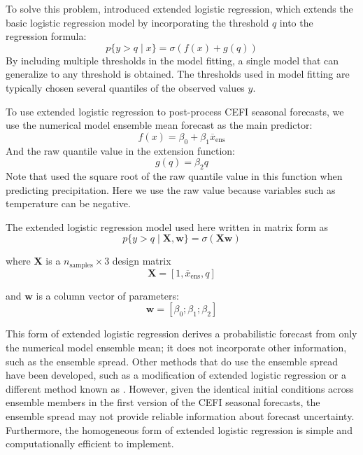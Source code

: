 \documentclass[12pt]{article}
\begin{document}
To solve this problem, \citet{Wilks2009} introduced extended logistic regression,
which extends the basic logistic regression model by incorporating
the threshold $q$ into the regression formula:
\begin{equation}
    p\{y > q \mid x\} = \sigma(f(x) + g(q))
\end{equation}
By including multiple thresholds in the model fitting,
a single model that can generalize to any threshold is obtained. 
The thresholds used in model fitting are typically chosen several
quantiles of the observed values $y$. 

To use extended logistic regression to post-process CEFI
seasonal forecasts, we use the numerical model ensemble mean 
forecast as the main predictor:
\begin{equation}
    f(x) = \beta_0 + \beta_1 \overline{x}_{\textrm{ens}}
\end{equation}
And the raw quantile value in the extension function:
\begin{equation}
    g(q) = \beta_2 q
\end{equation}
Note that \citet{Wilks2009} used the square root of the raw quantile value in this function when predicting precipitation. Here we use
the raw value because variables such as temperature can be negative. 

The extended logistic regression model used here written in matrix form as 
\begin{equation}
    p \{y > q \mid \mathbf{X}, \mathbf{w} \} = \sigma(\mathbf{X w})
    \label{eqn:elr}
\end{equation}

where $\mathbf{X}$ is a $n_{\textrm{samples}} \times 3$ design matrix
\begin{equation}
    \mathbf{X} = [1, \overline{x}_{\textrm{ens}}, q]
\end{equation}

and $ \mathbf{w} $ is a column vector of parameters:
\begin{equation}
    \mathbf{w} = [\beta_0; \beta_1; \beta_2]
\end{equation}

This form of extended logistic regression derives a probabilistic
forecast from only the numerical model ensemble mean; it does not incorporate other information,
such as the ensemble spread.
Other methods that do use the ensemble spread have been developed,
such as a modification of extended logistic regression \citep{Messner2014}
or a different method known as  \citep{Gneiting2005}.
However, given the identical initial conditions across ensemble members
in the first version of the CEFI seasonal forecasts, the ensemble spread
may not provide reliable information about forecast uncertainty.
Furthermore, the homogeneous form of extended logistic regression
is simple and computationally efficient to implement. 
\end{document}
